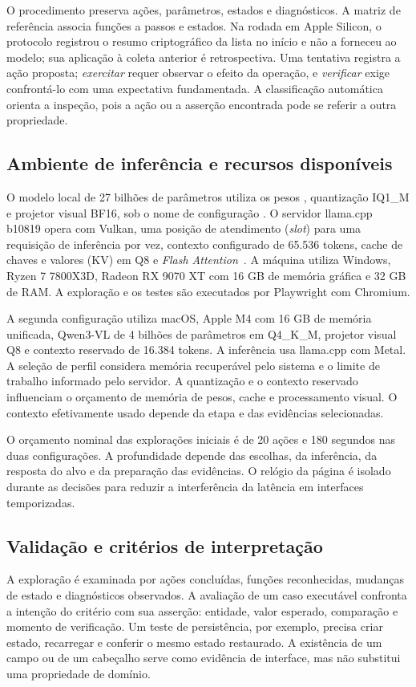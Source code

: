 \documentclass[12pt]{article}
\begin{document}
O procedimento preserva ações, parâmetros, estados e diagnósticos. A matriz de referência associa funções a passos e estados. Na rodada em Apple Silicon, o protocolo registrou o resumo criptográfico da lista no início e não a forneceu ao modelo; sua aplicação à coleta anterior é retrospectiva. Uma tentativa registra a ação proposta; \textit{exercitar} requer observar o efeito da operação, e \textit{verificar} exige confrontá-lo com uma expectativa fundamentada. A classificação automática orienta a inspeção, pois a ação ou a asserção encontrada pode se referir a outra propriedade.

\subsection{Ambiente de inferência e recursos disponíveis}
O modelo local de 27 bilhões de parâmetros utiliza os pesos , quantização IQ1\_M e projetor visual BF16, sob o nome de configuração . O servidor llama.cpp b10819 opera com Vulkan, uma posição de atendimento (\textit{slot}) para uma requisição de inferência por vez, contexto configurado de 65.536 tokens, cache de chaves e valores (KV) em Q8 e \textit{Flash Attention}~\cite{ggml2026llama}. A máquina utiliza Windows, Ryzen 7 7800X3D, Radeon RX 9070 XT com 16 GB de memória gráfica e 32 GB de RAM. A exploração e os testes são executados por Playwright com Chromium.

A segunda configuração utiliza macOS, Apple M4 com 16 GB de memória unificada, Qwen3-VL de 4 bilhões de parâmetros em Q4\_K\_M, projetor visual Q8 e contexto reservado de 16.384 tokens. A inferência usa llama.cpp com Metal. A seleção de perfil considera memória recuperável pelo sistema e o limite de trabalho informado pelo servidor. A quantização e o contexto reservado influenciam o orçamento de memória de pesos, cache e processamento visual. O contexto efetivamente usado depende da etapa e das evidências selecionadas.

O orçamento nominal das explorações iniciais é de 20 ações e 180 segundos nas duas configurações. A profundidade depende das escolhas, da inferência, da resposta do alvo e da preparação das evidências. O relógio da página é isolado durante as decisões para reduzir a interferência da latência em interfaces temporizadas.

\subsection{Validação e critérios de interpretação}
A exploração é examinada por ações concluídas, funções reconhecidas, mudanças de estado e diagnósticos observados. A avaliação de um caso executável confronta a intenção do critério com sua asserção: entidade, valor esperado, comparação e momento de verificação. Um teste de persistência, por exemplo, precisa criar estado, recarregar e conferir o mesmo estado restaurado. A existência de um campo ou de um cabeçalho serve como evidência de interface, mas não substitui uma propriedade de domínio.
\end{document}
